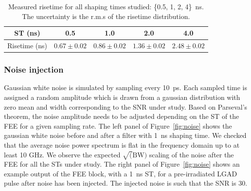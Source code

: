 \documentclass[preprint,1p]{elsarticle}
\begin{document}
\begin{table}\label{tab:risetime}
  \begin{center}
    \begin{tabular}{c|cccc}
    ST (ns) & 0.5  & 1.0 & 2.0 & 4.0 \\\hline
    Risetime (ns) & $0.67\pm 0.02$ & $0.86\pm 0.02$ & $1.36\pm 0.02$ & $2.48\pm 0.02$ \\
    \end{tabular}
    \caption{Measured risetime for all shaping times studied: \{0.5, 1, 2, 4\}~\si{ns}. The uncertainty is the r.m.s of the
    risetime distribution.}
  \end{center}
 \end{table}




\subsubsection{Noise injection}\label{sec:noise_simulation}
Gaussian white noise is simulated by sampling every 10~\si{ps}. Each
sampled time is assigned a random amplitude which is drawn from a gaussian distribution with zero mean and width corresponding to the SNR
under study. Based on Parseval's theorem, the noise amplitude needs to be adjusted depending
on the ST of the FEE for a given sampling rate. The left panel of Figure~\ref{fig:noise} shows the gaussian white noise before and after a filter with 
1~\si{ns} shaping time. We checked that the average noise power spectrum is flat in the frequency domain up to
at least 10 GHz. We observe the expected $\sqrt(\mathrm{BW})$ scaling of the noise after
 the FEE for all the STs under study. The right panel of Figure~\ref{fig:noise} shows an example output of the
FEE block, with a 1~\si{ns} ST, for a pre-irradiated LGAD pulse after noise has been injected. The injected noise is
such that the SNR is 30. 
\end{document}

